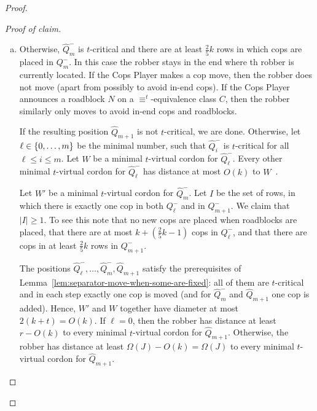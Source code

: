 \documentclass[10pt,a4paper]{article}
\DeclarePairedDelimiter\set{\lbrace}{\rbrace}
\newcommand{\comp}{\equiv}
\newenvironment{claimproof}{\begin{proof}[Proof of claim]}{\end{proof}}
\newcommand{\claimqedhere}{\qedhere}
\begin{document}
\begin{proof}
\begin{claimproof}
\begin{enumerate}[(a)]
			
			
			\item Otherwise, $\hat{Q}_m^-$ is $t$-critical and there are at least $\frac{2}{5}k$ rows in which cops are placed in $Q_m^-$. In this case the robber stays in the end where th robber is currently located.
			If the Cops Player makes a cop move,
			then the robber does not move (apart from possibly to avoid in-end cops).
			If the Cops Player announces a roadblock $N$ on a $\comp^t$\nobreakdash-equivalence class $C$, then the robber similarly only moves to avoid in-end cops and roadblocks.
			
			If the resulting position $\hat{Q}_{m+1}$ is not $t$-critical, we are done.
			Otherwise, let $\ell \in \set{0,\dots,m}$ be the minimal number, such that $\hat{Q}_i^-$
			is $t$-critical for all $\ell\leq i \leq m$.
			Let $W$ be a minimal $t$-virtual cordon for $\hat{Q}_\ell^-$.
			Every other minimal  $t$-virtual cordon for $\hat{Q}_\ell^-$
			has distance at most $O(k)$ to $W$~\cite{RFJN024}.
			
			Let $W'$ be a  minimal $t$-virtual cordon for $\hat{Q}_m^-$.
			Let $I$ be the set of rows,
			in which there is exactly one cop in both $Q_\ell^-$ and in $Q_{m+1}^-$.
			We claim that $|I|\geq 1$. To see this note that
			no new cops are placed when roadblocks are placed,
			that there are at most $k + (\frac{2}{5}k-1)$ cops in $Q_\ell^-$,
			and that there are cops in at least $\frac{2}{5}k$ rows in $Q_{m+1}^-$.
			
			
			The positions $\hat{Q}_\ell^-, \dots, \hat{Q}_m^-, \hat{Q}_{m+1}$ satisfy the prerequisites of Lemma~\ref{lem:separator-move-when-some-are-fixed}:
			all of them are $t$-critical and in each step exactly one cop is moved (and for $\hat{Q}_m^-$ and $\hat{Q}_{m+1}$ one cop is added).
			Hence, $W'$ and $W$ together have diameter at most $2(k+t) = O(k)$.
			If $\ell = 0$, then the robber has distance at least $r-O(k)$
			to every minimal $t$-virtual cordon for $\hat{Q}_{m+1}$.
			Otherwise, the robber has distance at least $\Omega(J) - O(k) = \Omega(J)$
			to every minimal $t$-virtual cordon for $\hat{Q}_{m+1}$.
			\claimqedhere
		\end{enumerate}
		
	\end{claimproof}
	

\end{proof}
\end{document}
